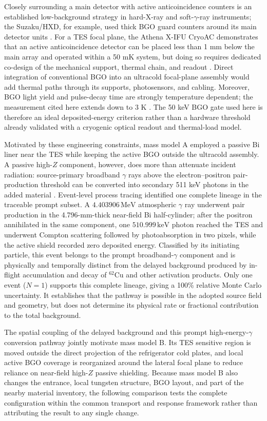 \documentclass[11pt]{article}
\newcommand{\keV}{\ensuremath{\,\mathrm{keV}}}
\newcommand{\MeV}{\ensuremath{\,\mathrm{MeV}}}
\begin{document}
Closely surrounding a main detector with active anticoincidence counters is an established low-background strategy in hard-X-ray and soft-$\gamma$-ray instruments; the Suzaku/HXD, for example, used thick BGO guard counters around its main detector units \cite{Takahashi2007HXD}. For a TES focal plane, the Athena X-IFU CryoAC demonstrates that an active anticoincidence detector can be placed less than 1 mm below the main array and operated within a 50 mK system, but doing so requires dedicated co-design of the mechanical support, thermal chain, and readout \cite{Lotti2021Athena,Macculi2023CryoAC,DAndrea2022CryoAC}. Direct integration of conventional BGO into an ultracold focal-plane assembly would add thermal paths through its supports, photosensors, and cabling. Moreover, BGO light yield and pulse-decay time are strongly temperature dependent; the measurement cited here extends down to 3 K \cite{Verdier2011BGO}. The 50 keV BGO gate used here is therefore an ideal deposited-energy criterion rather than a hardware threshold already validated with a cryogenic optical readout and thermal-load model.

Motivated by these engineering constraints, mass model A employed a passive Bi liner near the TES while keeping the active BGO outside the ultracold assembly. A passive high-$Z$ component, however, does more than attenuate incident radiation: source-primary broadband $\gamma$ rays above the electron--positron pair-production threshold can be converted into secondary 511 keV photons in the added material \cite{NISTXCOM}. Event-level process tracing identified one complete lineage in the traceable prompt subset. A $4.403906\MeV$ atmospheric $\gamma$ ray underwent pair production in the 4.796-mm-thick near-field Bi half-cylinder; after the positron annihilated in the same component, one $510.999\keV$ photon reached the TES and underwent Compton scattering followed by photoabsorption in two pixels, while the active shield recorded zero deposited energy. Classified by its initiating particle, this event belongs to the prompt broadband-$\gamma$ component and is physically and temporally distinct from the delayed background produced by in-flight accumulation and decay of $^{62}$Cu and other activation products. Only one event ($N=1$) supports this complete lineage, giving a 100\% relative Monte Carlo uncertainty. It establishes that the pathway is possible in the adopted source field and geometry, but does not determine its physical rate or fractional contribution to the total background.

The spatial coupling of the delayed background and this prompt high-energy-$\gamma$ conversion pathway jointly motivate mass model B. Its TES sensitive region is moved outside the direct projection of the refrigerator cold plates, and local active BGO coverage is reorganized around the lateral focal plane to reduce reliance on near-field high-$Z$ passive shielding. Because mass model B also changes the entrance, local tungsten structure, BGO layout, and part of the nearby material inventory, the following comparison tests the complete configuration within the common transport and response framework rather than attributing the result to any single change.
\endgroup
\end{document}
